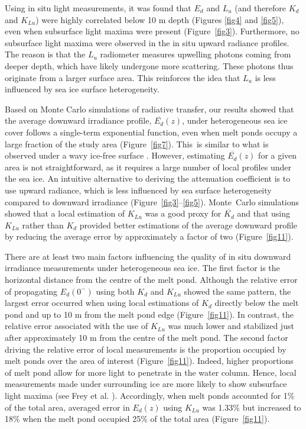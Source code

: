\documentclass[applsci,article,accept,moreauthors,pdftex,10pt,a4paper]{Definitions/mdpi}
\newcommand{\ked}{\ensuremath{K_{d}}}
\newcommand{\klu}{\ensuremath{K_{Lu}}}
\newcommand{\edz}{\ensuremath{{E_d(z)}}}
\newcommand{\ed}{\ensuremath{{E_d}}}
\newcommand{\lu}{\ensuremath{{L_u}}}
\newcommand{\edzero}{\ensuremath{{E_d(0^-)}}}
\newcommand{\meanedz}{\ensuremath{{\overline{E_d}(z)}}}
\newcommand{\meanked}{\ensuremath{{\overline{K_{d}}}}}
\begin{document}
Using in situ light measurements, it was found that \ed{} and \lu{} (and therefore \ked{} and \klu{}) were highly correlated below 10 m depth (Figures \ref{fig4} and \ref{fig5}), even when subsurface light maxima were present (Figure~\ref{fig3}). Furthermore, no subsurface light maxima were observed in the in situ upward radiance profiles. The reason is that the \lu{} radiometer measures upwelling photons coming from deeper depth, which have likely undergone more scattering.  These photons thus originate from a larger surface area. This reinforces the idea that \lu{} is less influenced by sea ice surface heterogeneity. 

Based on Monte Carlo simulations of radiative transfer, our results showed that the average downward irradiance profile, \meanedz{}, under heterogeneous sea ice cover follows a single-term exponential function, even when melt ponds occupy a large fraction of the study area (Figure~\ref{fig7}). This~is similar to what is observed under a wavy ice-free surface \citep{Zaneveld2001}. However, estimating \meanedz{} for a given area is not straightforward, as it requires a large number of local profiles under the sea ice. An intuitive alternative to deriving the attenuation coefficient is to use upward radiance, which is less influenced by sea surface heterogeneity compared to downward irradiance (Figure~\ref{fig3}--\ref{fig5}). Monte~Carlo simulations showed that a local estimation of \klu{} was a good proxy for \meanked{} and that using \klu{} rather than \ked{} provided better estimations of the average downward profile by reducing the average error by approximately a factor of two (Figure~\ref{fig11}). 

There are at least two main factors influencing the quality of in situ downward irradiance measurements under heterogeneous sea ice. The first factor is the horizontal distance from the centre of the melt pond. Although the relative error of propagating \edzero{} using both \ked{} and \klu{} showed the same pattern, the largest error occurred when using local estimations of \ked{} directly below the melt pond and up to 10 m from the melt pond edge (Figure~\ref{fig11}). In contrast, the relative error associated with the use of \klu{} was much lower and stabilized just after approximately 10 m from the centre of the melt pond. The second factor driving the relative error of local measurements is the proportion occupied by melt ponds over the area of interest (Figure~\ref{fig11}). Indeed, higher proportions of melt pond allow for more light to penetrate in the water column. Hence, local measurements made under surrounding ice are more likely to show subsurface light maxima (see Frey et al. \cite{Frey2011}). Accordingly, when melt ponds accounted for 1\% of the total area, averaged error in \edz{} using \klu{} was 1.33\% but increased to 18\% when the melt pond occupied 25\% of the total area (Figure~\ref{fig11}).
\end{document}
